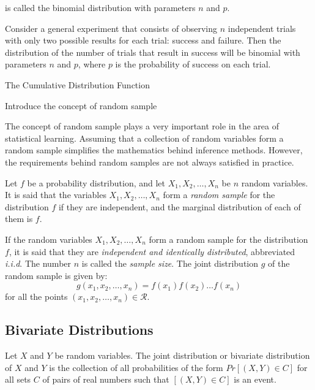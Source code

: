 {\color{red} is called the binomial distribution with parameters $n$ and $p$.}

{\color{red} Consider a general experiment that consists of observing $n$ independent trials with only two possible results for each trial: success and failure. Then the distribution of the number of trials that result in success will be binomial with parameters $n$ and $p$, where $p$ is the probability of success on each trial.} 

The Cumulative Distribution Function

{\color{red} Introduce the concept of random sample}

The concept of random sample plays a very important role in the area of statistical learning. Assuming that a collection of random variables form a random sample simplifies the mathematics behind inference methods. However, the requirements behind random samples are not always satisfied in practice.

\begin{definition}
Let $f$ be a probability distribution, and let $X_1, X_2, \ldots, X_n$ be $n$ random variables. It is said that the variables $X_1, X_2, \ldots, X_n$ form a \emph{random sample} for the distribution $f$ if they are independent, and the marginal distribution of each of them is $f$. 
\end{definition}

If the random variables $X_1, X_2, \ldots, X_n$ form a random sample for the distribution $f$, it is said that they are \emph{independent and identically distributed}, abbreviated \emph{i.i.d}. The number $n$ is called the \emph{sample size}. The joint distribution $g$ of the random sample is given by:
\[
g \left( x_1, x_2, \ldots, x_n \right) = f \left( x_1 \right) f \left( x_2 \right) \ldots f \left( x_n \right)
\]
for all the points $\left( x_1, x_2, \ldots, x_n \right) \in \mathcal{R}$.


\subsection{Bivariate Distributions}

\begin{definition}
Let $X$ and $Y$ be random variables. The joint distribution or bivariate distribution of $X$ and $Y$ is the collection of all probabilities of the form $Pr\left[\left(X,Y\right)\in C\right]$ for all sets $C$ of pairs of real numbers such that $\left[\left(X,Y\right)\in C\right]$ is an event.
\end{definition}

